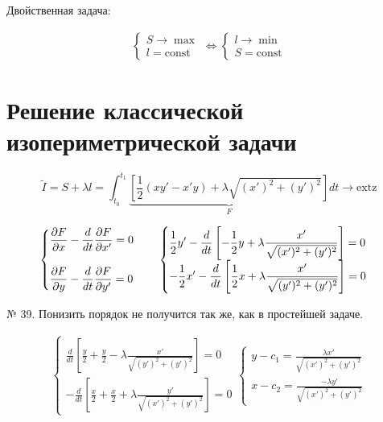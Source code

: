 \documentclass[12pt, a4paper]{report}
\begin{document}
Двойственная  задача: 

\[ \begin{aligned}
\begin{cases}
S \to  \max  \\
l = \mathrm{const}
\end{cases}
\Leftrightarrow 
\begin{cases}
l \to  \min  \\
S = \mathrm{const}
\end{cases}
\end{aligned} \]

\section{Решение классической изопериметрической задачи}

\[ \tilde{I } = S + \lambda l = \int_{t_0 }^{t_1 } \underbrace{\left[ \frac{1}{2 } (x y ' - x' y )+ \lambda \sqrt{(x') ^2 + (y ' ) ^2 } \right]}_{F}dt \to  \mathrm{extz}  \] 

\[ \begin{aligned}
    \begin{cases}
        \displaystyle \frac{\partial F }{\partial x } - \frac{d}{dt } \frac{\partial  F }{\partial  x ' } = 0 \quad  \\ 
        \vspace{0.01 mm} \\
        \displaystyle \frac{\partial F }{\partial y } - \frac{d}{dt } \frac{\partial  F }{\partial  y ' } = 0 \quad 
    \end{cases}
    \begin{cases}
        \displaystyle  \frac{1}{2 } y ' - \frac{d}{dt } \left[ -\frac{1}{2 } y + \lambda \frac{x ' }{\sqrt{(x') ^2 + (y ' ) ^2 }}  \right] =0\\
        \displaystyle -\frac{1}{2 } x ' - \frac{d}{dt } \left[ \frac{1}{2 } x + \lambda \frac{x ' }{\sqrt{(y') ^2 + (y ' ) ^2 }}  \right] =0 
    \end{cases}
\end{aligned}
\] 

№ 39.  Понизить порядок не получится так же, как в простейшей задаче.

\[ \begin{aligned}
    \begin{cases}
        \displaystyle \frac{d}{dt } \left[ \frac{y}{2 } + \frac{y}{2 } - \lambda \frac{x' }{\sqrt{(y') ^2 + (y ' ) ^2 }}  \right] =0 \\
        \displaystyle -\frac{d}{dt } \left[ \frac{x}{2 } + \frac{x}{2 } + \lambda \frac{y' }{\sqrt{(x') ^2 + (y ' ) ^2 }}  \right] =0
    \end{cases} 
    \begin{cases}
    \displaystyle y - c_1 = \frac{\lambda x' }{\sqrt{(x') ^2 + (y ' ) ^2 }} \\
    \displaystyle x - c_2 = \frac{-\lambda y' }{\sqrt{(x') ^2 + (y ' ) ^2 }}
    \end{cases}
\end{aligned}\] 
\end{document}
